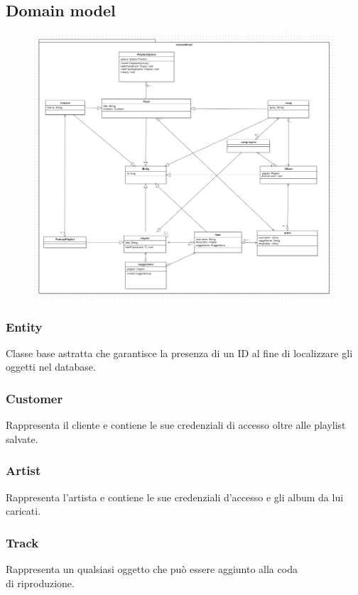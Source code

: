 \documentclass{article}
\begin{document}
  \subsection{Domain model}

  \begin{figure}[H]
    \includegraphics[scale=0.4]{model01}
  \end{figure}

  \subsubsection{Entity}
  Classe base astratta che garantisce la presenza di un ID al fine di localizzare gli oggetti nel database.
  \subsubsection{Customer}
  Rappresenta il cliente e contiene le sue credenziali di accesso oltre alle playlist salvate.
  \subsubsection{Artist}
  Rappresenta l'artista e contiene le sue credenziali d'accesso e gli album da lui caricati.
  \subsubsection{Track}
  Rappresenta un qualsiasi oggetto che può essere aggiunto alla coda\\ di riproduzione.
\end{document}
